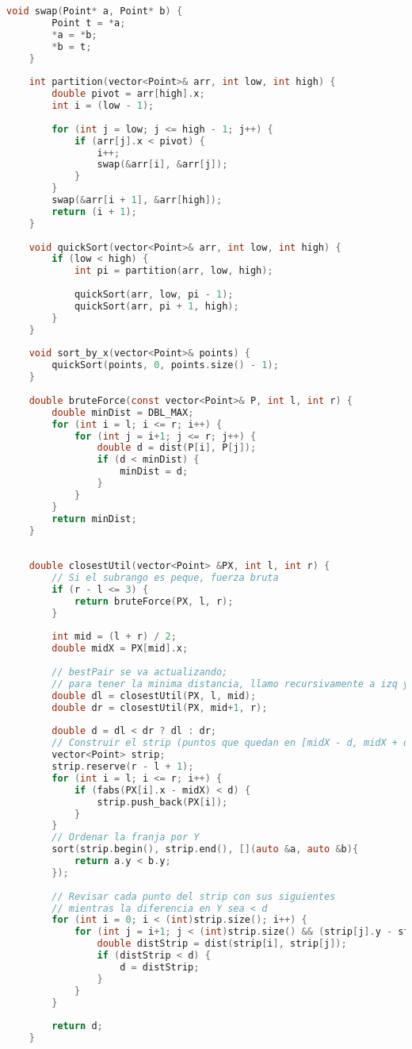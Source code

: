 \documentclass[a4paper,12pt]{article}
\begin{document}
\begin{lstlisting}[language=C, caption={Divide y vencerás de \textbf{"El par de puntos más cercano"}}]
	void swap(Point* a, Point* b) {
		Point t = *a;
		*a = *b;
		*b = t;
	}
	
	int partition(vector<Point>& arr, int low, int high) {
		double pivot = arr[high].x;
		int i = (low - 1);
	
		for (int j = low; j <= high - 1; j++) {
			if (arr[j].x < pivot) {
				i++;
				swap(&arr[i], &arr[j]);
			}
		}
		swap(&arr[i + 1], &arr[high]);
		return (i + 1);
	}
	
	void quickSort(vector<Point>& arr, int low, int high) {
		if (low < high) {
			int pi = partition(arr, low, high);
	
			quickSort(arr, low, pi - 1);
			quickSort(arr, pi + 1, high);
		}
	}
	
	void sort_by_x(vector<Point>& points) {
		quickSort(points, 0, points.size() - 1);
	}
	
	double bruteForce(const vector<Point>& P, int l, int r) {
		double minDist = DBL_MAX;
		for (int i = l; i <= r; i++) {
			for (int j = i+1; j <= r; j++) {
				double d = dist(P[i], P[j]);
				if (d < minDist) {
					minDist = d;
				}
			}
		}
		return minDist;
	}
	
	
	double closestUtil(vector<Point> &PX, int l, int r) {
		// Si el subrango es peque, fuerza bruta
		if (r - l <= 3) {
			return bruteForce(PX, l, r);
		}
	
		int mid = (l + r) / 2;
		double midX = PX[mid].x;
	
		// bestPair se va actualizando; 
		// para tener la minima distancia, llamo recursivamente a izq y der
		double dl = closestUtil(PX, l, mid);
		double dr = closestUtil(PX, mid+1, r);
	
		double d = dl < dr ? dl : dr;
		// Construir el strip (puntos que quedan en [midX - d, midX + d])
		vector<Point> strip;
		strip.reserve(r - l + 1);
		for (int i = l; i <= r; i++) {
			if (fabs(PX[i].x - midX) < d) {
				strip.push_back(PX[i]);
			}
		}
		// Ordenar la franja por Y
		sort(strip.begin(), strip.end(), [](auto &a, auto &b){
			return a.y < b.y;
		});
	
		// Revisar cada punto del strip con sus siguientes
		// mientras la diferencia en Y sea < d
		for (int i = 0; i < (int)strip.size(); i++) {
			for (int j = i+1; j < (int)strip.size() && (strip[j].y - strip[i].y) < d; j++) {
				double distStrip = dist(strip[i], strip[j]);
				if (distStrip < d) {
					d = distStrip;
				}
			}
		}
	
		return d;
	}
\end{lstlisting}
\end{document}
